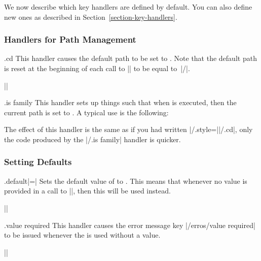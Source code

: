 We now describe which key handlers are defined by default. You can also define
new ones as described in Section~\ref{section-key-handlers}.


\subsubsection{Handlers for Path Management}

\begin{handler}{{.cd}}
    This handler causes the default path to be set to . Note that the
    default path is reset at the beginning of each call to |\pgfkeys| to be
    equal to~|/|.

    \example ||
\end{handler}

\begin{handler}{{.is family}}
\label{section-is family-handler}
    This handler sets up things such that when  is executed, then the
    current path is set to . A typical use is the following:
\begin{codeexample}
\end{codeexample}
    The effect of this handler is the same as if you had written
    |/.style=||/.cd|, only the code produced by the
    |/.is family| handler is quicker.
\end{handler}


\subsubsection{Setting Defaults}
\label{section-default-handlers}

\begin{handler}{{.default}|=|}
    Sets the default value of  to . This means that
    whenever no value is provided in a call to |\pgfkeys|, then this
     will be used instead.

    \example ||
\end{handler}

\begin{handler}{{.value required}}
    This handler causes the error message key |/erros/value required| to be
    issued whenever the  is used without a value.

    \example ||
\end{handler}

